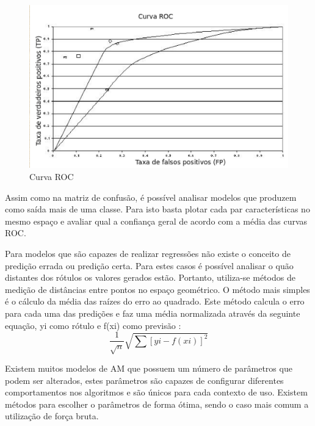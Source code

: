 \begin{figure}[!h]
\centering
\includegraphics[keepaspectratio=true,scale=0.70]
{figuras/roc.eps}
\caption{Curva ROC}
\label{over}
\end{figure}

Assim como na matriz de confusão, é possível analisar modelos que produzem como saída mais de uma classe. Para isto basta plotar cada par características no mesmo espaço e avaliar qual a confiança geral de acordo com a média das curvas ROC.

Para modelos que são capazes de realizar regressões não existe o conceito de predição errada ou predição certa. Para estes casos é possível analisar o quão distantes dos rótulos os valores gerados estão. Portanto, utiliza-se métodos de medição de distâncias entre pontos no espaço geométrico. O método mais simples é o cálculo da média das raízes do erro ao quadrado. Este método calcula o erro para cada uma das predições e faz uma média normalizada através da seguinte equação, yi como rótulo e f(xi) como previsão \cite{real2013}: 
 \[
       \frac{1}{\sqrt{n}}\sqrt{\sum \left [ y{i} - f\left ( x{i} \right )\right ]^{2} }
  \] 
  
Existem muitos modelos de AM que possuem um número de parâmetros que podem ser alterados, estes parâmetros são capazes de configurar diferentes comportamentos nos algoritmos e são únicos para cada contexto de uso. Existem métodos para escolher o parâmetros de forma ótima, sendo o caso mais comum a utilização de força bruta. 









































